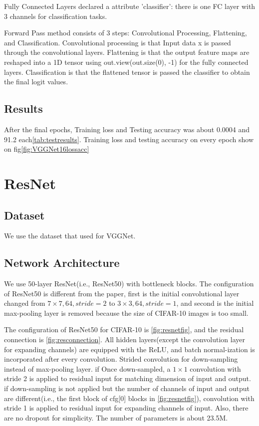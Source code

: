 \documentclass[extendedabs]{bmvc2k}
\begin{document}
Fully Connected Layers declared a attribute 'classifier': there is one FC layer with 3 channels for classification tasks.

Forward Pass method consists of 3 steps: Convolutional Processing, Flattening, and Classification. Convolutional processing is that Input data x is passed through the convolutional layers. Flattening is that the output feature maps are reshaped into a 1D tensor using out.view(out.size(0), -1) for the fully connected layers. Classification is that the flattened tensor is passed the classifier to obtain the final logit values.

\subsection{Results}
After the final epochs, Training loss and Testing accuracy was about 0.0004 and 91.2 each\ref{tab:testresults}. Training loss and testing accuracy on every epoch show on fig\ref{fig:VGGNet16lossacc}

\section{ResNet}
\subsection{Dataset}
We use the dataset that used for VGGNet.
\subsection{Network Architecture}
We use 50-layer ResNet(i.e., ResNet50) with bottleneck blocks. The configuration of ResNet50 is different from the paper\cite{resnet_paper}, first is the initial convolutional layer changed from $7\times7,64, stride=2$ to $3\times3, 64, stride=1$, and second is the initial max-pooling layer is removed because the size of CIFAR-10\cite{cifar10} images is too small. 

The configuration of ResNet50 for CIFAR-10\cite{cifar10} is \ref{fig:resnetfig}, and the residual connection is \ref{fig:resconnection}. All hidden layers(except the convolution layer for expanding channels) are equipped with the ReLU\cite{alexnet}, and batch normal-ization\cite{batchnorm} is incorporated after every convolution. Strided convolution for down-sampling instead of max-pooling layer. if Once down-sampled, a $1\times1$ convolution with stride 2 is applied to residual input for matching dimension of input and output. if down-sampling is not applied but the number of channels of input and output are different(i.e., the first block of cfg[0] blocks in \ref{fig:resnetfig}), convolution with stride 1 is applied to residual input for expanding channels of input. Also, there are no dropout for simplicity. The number of parameters is about 23.5M.
\end{document}

